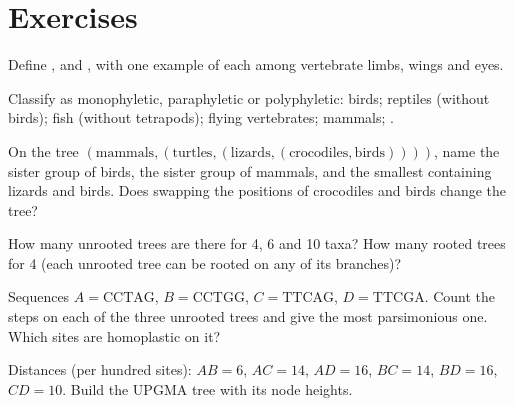 \section{Exercises}

\begin{exercise}[$\star$]\label{exo:b2:phylogenetic-trees:1}
Define ,  and , with one example of
each among vertebrate limbs, wings and eyes.
\end{exercise}

\begin{exercise}[$\star$]\label{exo:b2:phylogenetic-trees:2}
Classify as monophyletic, paraphyletic or polyphyletic: birds;
reptiles (without birds); fish (without tetrapods); flying
vertebrates; mammals; .
\end{exercise}

\begin{exercise}[$\star$]\label{exo:b2:phylogenetic-trees:3}
On the tree $(\text{mammals},(\text{turtles},(\text{lizards},
(\text{crocodiles},\text{birds}))))$, name the sister group of
birds, the sister group of mammals, and the smallest 
containing lizards and birds. Does swapping the positions of
crocodiles and birds change the tree?
\end{exercise}

\begin{exercise}[$\star$]\label{exo:b2:phylogenetic-trees:4}
How many unrooted trees are there for 4, 6 and 10 taxa? How many
rooted trees for 4 (each unrooted tree can be rooted on any of its
branches)?
\end{exercise}

\begin{exercise}[$\star\star$]\label{exo:b2:phylogenetic-trees:5}
Sequences $A = \mathrm{CCTAG}$, $B = \mathrm{CCTGG}$, $C =
\mathrm{TTCAG}$, $D = \mathrm{TTCGA}$. Count the steps on each of the
three unrooted trees and give the most parsimonious one. Which
sites are homoplastic on it?
\end{exercise}

\begin{exercise}[$\star\star$]\label{exo:b2:phylogenetic-trees:6}
Distances (per hundred sites): $AB = 6$, $AC = 14$, $AD = 16$,
$BC = 14$, $BD = 16$, $CD = 10$. Build the UPGMA tree with its node
heights.
\end{exercise}

